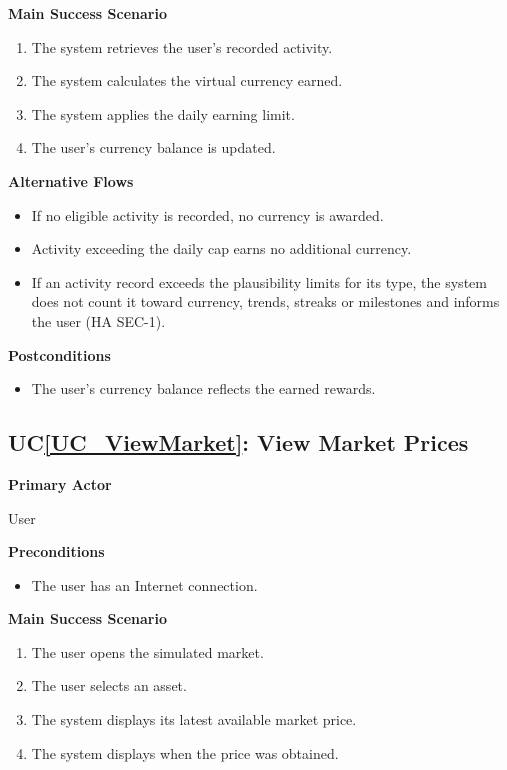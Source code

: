 \documentclass[12pt]{article}
\newcounter{ucnum} %
\newcommand{\ucref}[1]{UC\ref{#1}}
\begin{document}
\textbf{Main Success Scenario}
\begin{enumerate}
\item The system retrieves the user's recorded activity.
\item The system calculates the virtual currency earned.
\item The system applies the daily earning limit.
\item The user's currency balance is updated.
\end{enumerate}

\textbf{Alternative Flows}
\begin{itemize}
\item If no eligible activity is recorded, no currency is awarded.
\item Activity exceeding the daily cap earns no additional currency.
\item If an activity record exceeds the plausibility limits for its type,
the system does not count it toward currency, trends, streaks or
milestones and informs the user (HA SEC-1).
\end{itemize}

\textbf{Postconditions}
\begin{itemize}
\item The user's currency balance reflects the earned rewards.
\end{itemize}


\label{UC_ViewMarket}
\subsection{\ucref{UC_ViewMarket}: View Market Prices}

\textbf{Primary Actor}

User

\textbf{Preconditions}
\begin{itemize}
\item The user has an Internet connection.
\end{itemize}

\textbf{Main Success Scenario}
\begin{enumerate}
\item The user opens the simulated market.
\item The user selects an asset.
\item The system displays its latest available market price.
\item The system displays when the price was obtained.
\end{enumerate}
\end{document}
